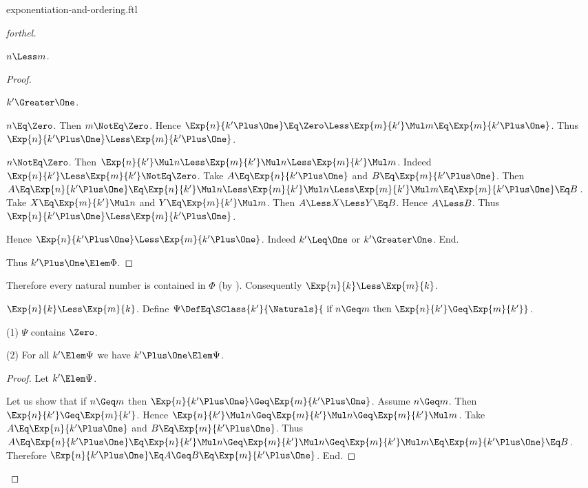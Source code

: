 \documentclass{stex}
\begin{document}
\begin{smodule}{exponentiation-and-ordering.ftl}
\begin{proof}[forthel]
\begin{case}{$n \Less m$.}
\begin{proof}
        \begin{case}{$k' \Greater \One$.}
          \begin{case}{$n \Eq \Zero$.}
            Then $m \NotEq \Zero$.
            Hence $\Exp{n}{k' \Plus \One}
              \Eq \Zero
              \Less \Exp{m}{k'} \Mul m
              \Eq \Exp{m}{k' \Plus \One}$.
            Thus $\Exp{n}{k' \Plus \One} \Less \Exp{m}{k' \Plus \One}$.
          \end{case}

          \begin{case}{$n \NotEq \Zero$.}
            Then $\Exp{n}{k'} \Mul n
              \Less \Exp{m}{k'} \Mul n
              \Less \Exp{m}{k'} \Mul m$.
            Indeed $\Exp{n}{k'} \Less \Exp{m}{k'} \NotEq \Zero$.
            Take $A \Eq \Exp{n}{k' \Plus \One}$ and $B \Eq \Exp{m}{k' \Plus \One}$. %
            Then $A
              \Eq \Exp{n}{k' \Plus \One}
              \Eq \Exp{n}{k'} \Mul n
              \Less \Exp{m}{k'} \Mul n
              \Less \Exp{m}{k'} \Mul m
              \Eq \Exp{m}{k' \Plus \One}
              \Eq B$.
            Take $X \Eq \Exp{m}{k'} \Mul n$ and $Y \Eq \Exp{m}{k'} \Mul m$.
            Then $A \Less X \Less Y \Eq B$.
            Hence $A \Less B$.
            Thus $\Exp{n}{k' \Plus \One} \Less \Exp{m}{k' \Plus \One}$.
          \end{case}
        \end{case}

        Hence $\Exp{n}{k' \Plus \One} \Less \Exp{m}{k' \Plus \One}$.
        Indeed $k' \Leq \One$ or $k' \Greater \One$.
      End.

      Thus $k' \Plus \One \Elem \Phi$.
    \end{proof}

    Therefore every natural number is contained in $\Phi$ (by ).
    Consequently $\Exp{n}{k} \Less \Exp{m}{k}$.
  \end{case}

  \begin{case}{$\Exp{n}{k} \Less \Exp{m}{k}$.}
    Define $\Psi \DefEq \SClass{k'}{\Naturals}{\text{ if }n \Geq m\text{ then }\Exp{n}{k'} \Geq \Exp{m}{k'}}$.

    (1) $\Psi$ contains $\Zero$.

    (2) For all $k' \Elem \Psi$ we have $k' \Plus \One \Elem \Psi$.
    \begin{proof}
      Let $k' \Elem \Psi$.

      Let us show that if $n \Geq m$ then $\Exp{n}{k' \Plus \One} \Geq \Exp{m}{k' \Plus \One}$.
        Assume $n \Geq m$.
        Then $\Exp{n}{k'} \Geq \Exp{m}{k'}$.
        Hence $\Exp{n}{k'} \Mul n \Geq \Exp{m}{k'} \Mul n \Geq \Exp{m}{k'} \Mul m$.
        Take $A \Eq \Exp{n}{k' \Plus \One}$ and $B \Eq \Exp{m}{k' \Plus \One}$. %
        Thus $A
          \Eq \Exp{n}{k' \Plus \One}
          \Eq \Exp{n}{k'} \Mul n
          \Geq \Exp{m}{k'} \Mul n
          \Geq \Exp{m}{k'} \Mul m
          \Eq \Exp{m}{k' \Plus \One}
          \Eq B$.
        Therefore $\Exp{n}{k' \Plus \One} \Eq A \Geq B \Eq \Exp{m}{k' \Plus \One}$.
      End.


\end{proof}
\end{case}
\end{proof}
\end{smodule}
\end{document}
